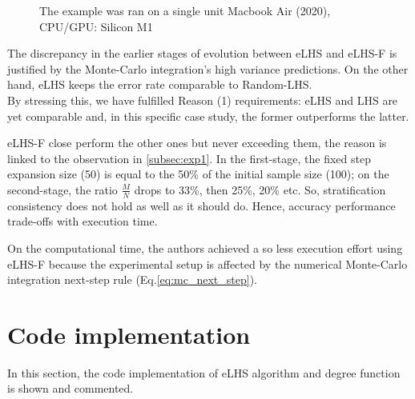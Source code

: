 \documentclass[12pt]{extarticle}
\newcommand{\meqref}[1]{Eq.\ref{#1}}
\newcommand{\midcaption}[1]{
    \captionsetup{justification=centering}
    \caption{#1}
}
\begin{document}
\begin{figure}[H]
    \centering
    \begin{subfigure}[a]{1\textwidth}
        \centering
    \end{subfigure}
    \begin{subfigure}[b]{1\textwidth}
        \centering
    \end{subfigure}
    \captionsetup{skip=0pt}
    \midcaption{The example was ran on a single unit Macbook Air (2020), CPU/GPU: Silicon M1}
    \label{fig:exp2}
\end{figure}

The discrepancy in the earlier stages of evolution between eLHS and eLHS-F is justified by the Monte-Carlo integration's high variance predictions. On the other hand, eLHS keeps the error rate comparable to Random-LHS.\\
By stressing this, we have fulfilled Reason (1) requirements: eLHS and LHS are yet comparable and, in this specific case study, the former outperforms the latter.

eLHS-F close perform the other ones but never exceeding them, the reason is linked to the observation in \cref{subsec:exp1}. In the first-stage, the fixed step expansion size (50) is equal to the 50\% of the initial sample size (100); on the second-stage, the ratio $\frac{M}{N}$ drops to 33\%, then 25\%, 20\% etc. So, stratification consistency does not hold as well as it should do. Hence, accuracy performance trade-offs with execution time.

On the computational time, the authors achieved a so less execution effort using eLHS-F because the experimental setup is affected by the numerical Monte-Carlo integration next-step rule (\meqref{eq:mc_next_step}).


\section{Code implementation}
\label{sec:code_implementation}
In this section, the code implementation of eLHS algorithm and degree function is shown and commented. 
\end{document}
